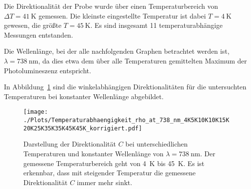 Die Direktionalität der Probe wurde über einen Temperaturbereich von $ \Delta T =\SI{41}{\kelvin} $ gemessen.
Die kleinste eingestellte Temperatur ist dabei $T =\SI{4}{\kelvin}$ gewesen, die größte 
$T =\SI{45}{\kelvin}$.
Es sind insgesamt 11 temperaturabhängige Messungen entstanden.

Die Wellenlänge, bei der alle nachfolgenden Graphen betrachtet werden ist, \\$\lambda =\SI{738}{\nano\meter}$,
da dies etwa dem über alle Temperaturen gemittelten Maximum der Photolumineszenz entspricht.

In Abbildung~\ref{fig:temp_all_nach} sind die winkelabhängigen Direktionalitäten für die untersuchten Temperaturen
bei konstanter Wellenlänge abgebildet.
\begin{figure}
    \centering
    \texttt{[image: ./Plots/Temperaturabhaengigkeit\_rho\_at\_738\_nm\_4K5K10K10K15K20K25K35K35K45K45K\_korrigiert.pdf]}
    \caption{Darstellung der Direktionalität $C$ bei unterschiedlichen Temperaturen und konstanter Wellenlänge 
    von $\lambda =\SI{738}{\nano\meter}$. 
    Der gemessene Temperaturbereich geht von \SI{4}{\kelvin} bis \SI{45}{\kelvin}.
    Es ist erkennbar, dass mit steigender Temperatur die gemessene Direktionalität $C$ immer mehr sinkt.}
    \label{fig:temp_all_nach}
\end{figure}
\FloatBarrier

